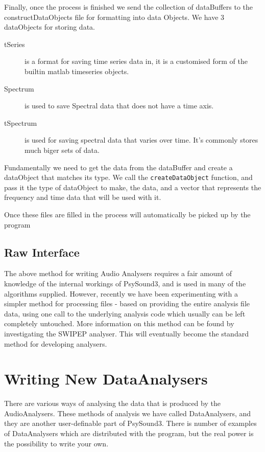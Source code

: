 \documentclass{article}
\begin{document}
Finally, once the process is finished we send the collection of dataBuffers to the constructDataObjects file for formatting into data Objects. We have 3 dataObjects for storing data.  

\begin{description}
	\item[tSeries] is a format for saving time series data in, it is a customised form of the builtin matlab timeseries objects. 
	
	\item[Spectrum] is used to save Spectral data that does not have a time axis.
	
	\item[tSpectrum] is used for saving spectral data that varies over time. It's commonly stores much biger sets of data.
	
\end{description}
	 
Fundamentally we need to get the data from the dataBuffer and create a dataObject that matches its type. We call the \texttt{createDataObject} function, and pass it the type of dataObject to make, the data, and a vector that represents the frequency and time data that will be used with it. 

Once these files are filled in the process will automatically be picked up by the program


\subsection{Raw Interface}

The above method for writing Audio Analysers requires a fair amount of knowledge of the internal workings of PsySound3, and is used in many of the algorithms supplied. However, recently we have been experimenting with a simpler method for processing files - based on providing the entire analysis file data, using one call to the underlying analysis code which usually can be left completely untouched. More information on this method can be found by investigating the SWIPEP analyser. This will eventually become the standard method for developing analysers. 


\clearpage
\section{Writing New DataAnalysers}

There are various ways of analysing the data that is produced by the AudioAnalysers. These methods of analysis we have called DataAnalysers, and they are another user-definable part of PsySound3. There is number of examples of DataAnalysers which are distributed with the program, but the real power is the possibility to write your own.
\end{document}
